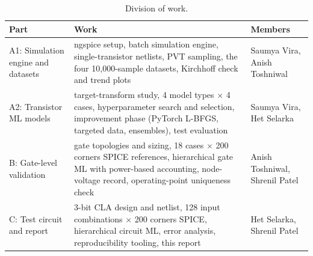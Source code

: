 \documentclass[11pt,a4paper]{article}
\newcommand{\pct}{\,\%}
\begin{document}
\begin{table}[H]
\centering
\caption{Division of work.}
\small
\begin{tabularx}{\textwidth}{>{\raggedright\arraybackslash}p{4.1cm}X>{\raggedright\arraybackslash}p{3.3cm}}
\toprule
Part & Work & Members \\
\midrule
A1: Simulation engine and datasets & ngspice setup, batch simulation engine, single-transistor netlists, PVT sampling,
the four 10{,}000-sample datasets, Kirchhoff check and trend plots & Saumya Vira, Anish Toshniwal \\
A2: Transistor ML models & target-transform study, 4 model types $\times$ 4 cases, hyperparameter search and selection,
improvement phase (PyTorch L-BFGS, targeted data, ensembles), test evaluation & Saumya Vira, Het Selarka \\
B: Gate-level validation & gate topologies and sizing, 18 cases $\times$ 200 corners SPICE references, hierarchical
gate ML with power-based accounting, node-voltage record, operating-point uniqueness check & Anish Toshniwal, Shrenil Patel \\
C: Test circuit and report & 3-bit CLA design and netlist, 128 input combinations $\times$ 200 corners SPICE,
hierarchical circuit ML, error analysis, reproducibility tooling, this report & Het Selarka, Shrenil Patel \\
\bottomrule
\end{tabularx}
\end{table}

\clearpage
\begin{abstract}
\noindent Leakage current of CMOS logic under process, voltage and temperature (PVT) variation is estimated
with machine learning instead of full SPICE simulation. Four transistor-level models (NMOS/PMOS, ON/OFF)
predict all four terminal currents ($I_d, I_g, I_s, I_b$) from VDD, temperature, width, terminal voltages and
five BSIM4 process parameters. They are built from 64{,}000 single-transistor SPICE simulations (40{,}000 in
the specification distribution plus 24{,}000 targeted near-rail samples; 49{,}600 used for fitting) and are
composed hierarchically into gate models (INV, NAND2, NOR2, AND2, OR2) and into a 36-gate, 192-transistor
3-bit carry-lookahead adder. On an independent evaluation set (200 new PVT corners, all 128 input
combinations of $A$, $B$ and $C_\text{in}$) the hierarchical estimate of the adder's leakage has a median
error of 0.58\pct, a 95th-percentile error of 2.25\pct\ and a mean accuracy of \textbf{99.22\pct};
individual gates reach 98.93\pct\ and transistors 98.56\pct. The 99\pct\ mean-accuracy target is met at
circuit level but not at gate or transistor level.
\end{abstract}
\end{document}
